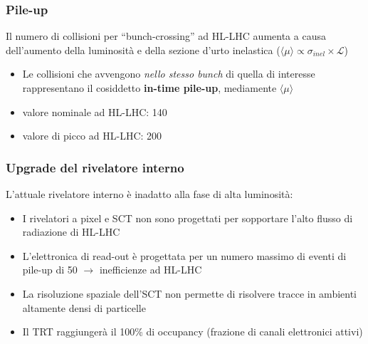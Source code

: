 \documentclass{beamer}
\begin{document}
\begin{frame}[t]
\frametitle{Pile-up}
Il numero di collisioni per ``bunch-crossing'' ad HL-LHC aumenta
a causa dell'aumento della luminosit\`a e della sezione d'urto inelastica 
($\langle\mu\rangle \propto \sigma_{inel} \times \mathcal{L}$)\\

\begin{itemize}
\item Le collisioni che avvengono \textit{nello stesso bunch} di quella di interesse
rappresentano il cosiddetto \textbf{in-time pile-up}, mediamente $\langle\mu\rangle$
\item valore nominale ad HL-LHC: 140
\item valore di picco ad HL-LHC: 200
\end{itemize}




\end{frame}


\begin{frame}
\frametitle{Upgrade del rivelatore interno}
L'attuale rivelatore interno \`e inadatto alla fase di alta luminosit\`a:
\pause
\begin{itemize}
\item<+-> I rivelatori a pixel e SCT non sono progettati per sopportare l'alto
flusso di radiazione di HL-LHC
\item<+-> L'elettronica di read-out \`e progettata per un numero massimo di eventi
		di pile-up di 50 $\rightarrow$ inefficienze ad HL-LHC
\item<+-> La risoluzione spaziale dell'SCT non permette di risolvere tracce
		in ambienti altamente densi di particelle
\item<+-> Il TRT raggiunger\`a il 100\% di occupancy (frazione di canali elettronici attivi)
\end{itemize}

\bigskip


\end{frame}
\end{document}
